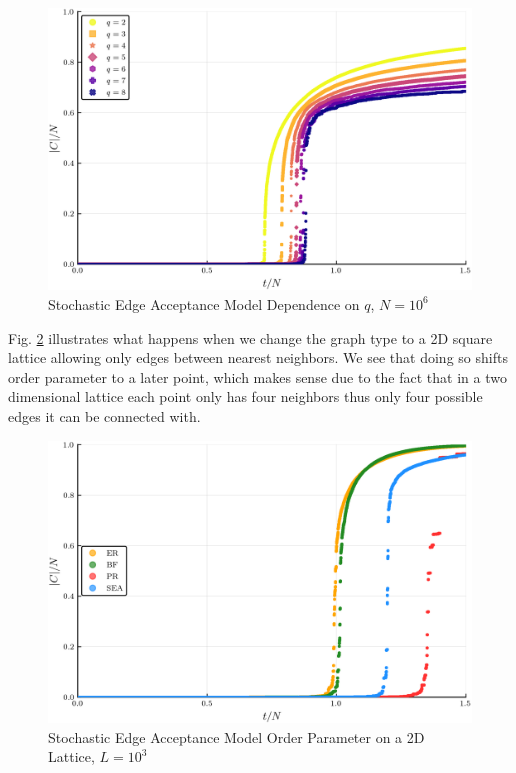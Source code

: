 \begin{figure}[H]
	\centering
	\includegraphics[width=350pt, clip]{images/q_scaling.png}
	\caption{Stochastic Edge Acceptance Model Dependence on $q$, $N = 10^6$}
	\label{fig:q_scaling}
\end{figure}

Fig. \ref{fig:Lattice2D_ER_BF_PR_SEA_transition} illustrates what happens when we change the graph type to a 2D square lattice allowing only edges between nearest neighbors.
We see that doing so shifts order parameter to a later point, which makes sense due to the fact that in a two dimensional lattice each point only has four neighbors thus only four possible edges it can be connected with.

\begin{figure}[H]
	\centering
	\includegraphics[width=350pt, clip]{images/Lattice2D_ER_BF_PR_SEA_1e6_order_param.png}
	\caption{Stochastic Edge Acceptance Model Order Parameter on a 2D Lattice, $L = 10^3$}
	\label{fig:Lattice2D_ER_BF_PR_SEA_transition}
\end{figure}

